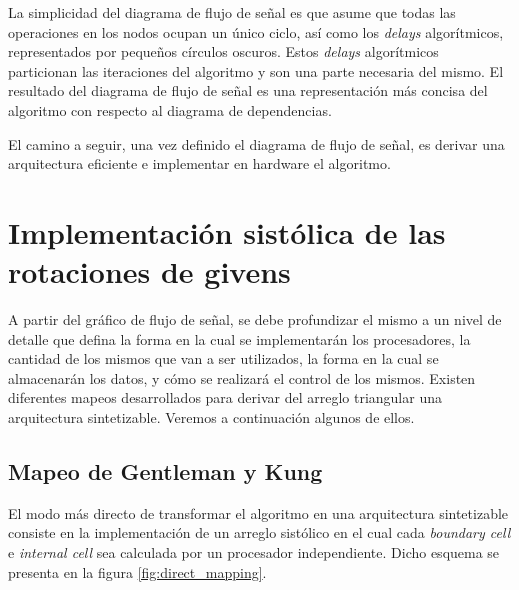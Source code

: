 La simplicidad del diagrama de flujo de señal es que asume que todas las operaciones en los nodos ocupan un único ciclo, así como los \textit{delays} algorítmicos, representados por pequeños círculos oscuros. Estos \textit{delays} algorítmicos particionan las iteraciones del algoritmo y son una parte necesaria del mismo. El resultado del diagrama de flujo de señal es una representación más concisa del algoritmo con respecto al diagrama de dependencias.

El camino a seguir, una vez definido el diagrama de flujo de señal, es derivar una arquitectura eficiente e implementar en hardware el algoritmo.

\newpage

\section{Implementación sistólica de las rotaciones de givens}

A partir del gráfico de flujo de señal, se debe profundizar el mismo a un nivel de detalle que defina la forma en la cual se implementarán los procesadores, la cantidad de los mismos que van a ser utilizados, la forma en la cual se almacenarán los datos, y cómo se realizará el control de los mismos. Existen diferentes mapeos desarrollados para derivar del arreglo triangular una arquitectura sintetizable. Veremos a continuación algunos de ellos.

\subsection{Mapeo de Gentleman y Kung}
\label{sec:mapeo_de_gentleman_y_kung}

El modo más directo de transformar el algoritmo en una arquitectura sintetizable consiste en la implementación de un arreglo sistólico en el cual cada \textit{boundary cell} e \textit{internal cell} sea calculada por un procesador independiente. Dicho esquema se presenta en la figura \ref{fig:direct_mapping}. 

